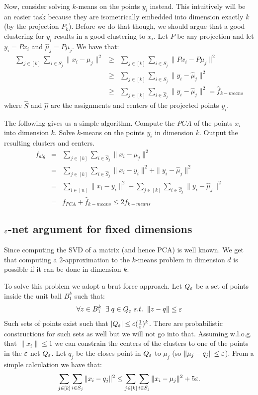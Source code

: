 \documentclass{article}
\begin{document}
Now, consider solving $k$-means on the points $y_i$ instead. This intuitively will be an easier task
because they are isometrically embedded into dimension exactly $k$ (by the projection $P_k$). 
Before we do that though, we should argue that a good clustering for $y_i$ results in a good clustering to $x_i$.
Let $P$ be any projection and let $y_i = Px_i$ and $\hat{\mu}_{j} = P{\mu}_{j}$. We have that:
\begin{eqnarray}
\sum_{j \in [k]} \sum_{i \in S_j}  \|x_i - \mu_j \|^2 &\ge& \sum_{j \in [k]} \sum_{i \in S_j}  \|Px_i - P\mu_j \|^2 \\
&\ge& \sum_{j \in [k]} \sum_{i \in S_j}  \|y_i - \hat{\mu}_{j}\|^2 \\
&\ge& \sum_{j \in [k]} \sum_{i \in \hat{S}_j}  \|y_i - \hat{\mu}_{j}\|^2 = \hat{f}_{k-means}
\end{eqnarray}
where $\hat{S}$ and $\hat{\mu}$ are the assignments and centers of the projected points $y_i$.


The following gives us a simple algorithm. Compute the $PCA$ of the points $x_i$ into dimension $k$.
Solve $k$-means on the points $y_i$ in dimension $k$. Output the resulting clusters and centers.
\begin{eqnarray}
f_{alg} &=& \sum_{j \in [k]} \sum_{i \in \hat{S}_j} \|x_i -\hat{\mu}_j \|^2 \\
&=& \sum_{j \in [k]} \sum_{i \in \hat{S}_j} \|x_i -y_i \|^2 + \|y_i - \hat{\mu}_j\|^2 \\
&= & \sum_{i \in [n]} \|x_i -y_i \|^2 + \sum_{j \in [k]} \sum_{i \in \hat{S}_j}\|y_i - \hat{\mu}_j\|^2 \\
&=& f_{PCA} + \hat{f}_{k-means} \le 2f_{k-means}
\end{eqnarray}

\subsection{$\varepsilon$-net argument for fixed dimensions}
Since computing the SVD of a matrix (and hence PCA) is well known. 
We get that computing a $2$-approximation to 
the $k$-means problem in dimension $d$ is possible if it can be done in dimension $k$.

To solve this problem we adopt a brut force approach.
Let $Q_{\varepsilon}$ be a set of points inside the unit ball $B^{k}_{1}$ such that:
\[
\forall z \in B^{k}_{1} \;\; \exists \; q \in Q_{\varepsilon} \; s.t. \;\; \|z - q\| \le \varepsilon
\]
Such sets of points exist such that  $|Q_{\varepsilon}| \le c(\frac{1}{\varepsilon})^k$. There are 
probabilistic constructions for such sets as well but we will not go into that.
Assuming w.l.o.g. that $\|x_i\| \le 1$ we can constrain the centers of 
the clusters to one of the points in the $\varepsilon$-net $Q_{\varepsilon}$.
Let $q_j$ be the closes point in $Q_{\varepsilon}$ to $\mu_j$ (so $\|\mu_j - q_j \| \le \varepsilon$).
From a simple calculation we have that:
\[
\sum_{j \in [k]} \sum_{i \in S_j} \|x_i - q_j \|^2 \le  \sum_{j \in [k]} \sum_{i \in S_j} \|x_i - \mu_j \|^2 + 5\varepsilon.
\]
 
\end{document}
